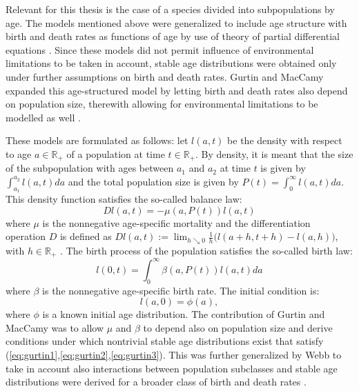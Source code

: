 \documentclass[11pt, a4paper]{article}
\theoremstyle{definition}
\begin{document}
    Relevant for this thesis is the case of a species divided into subpopulations by age. The models mentioned above were generalized to include age structure with birth and death rates as functions of age by use of theory of partial differential equations \autocite{lotka1911, mckendrick1925}. Since these models did not permit influence of environmental limitations to be taken in account, stable age distributions were obtained only under further assumptions on birth and death rates. Gurtin and MacCamy expanded this age-structured model by letting birth and death rates also depend on population size, therewith allowing for environmental limitations to be modelled as well \autocite{gurtin1974}.

    These models are formulated as follows: let $l(a,t)$ be the density with respect to age $a\in\mathbb{R}_+$ of a population at time $t\in\mathbb{R}_+$. By density, it is meant that the size of the subpopulation with ages between $a_1$ and $a_2$ at time $t$ is given by $\int_{a_1}^{a_2} l(a,t)da$ and the total population size is given by $P(t) = \int_0^{\infty} l(a,t)da$. This density function satisfies the so-called balance law:
    \begin{equation}\label{eq:gurtin1}
        Dl(a,t) = -\mu(a, P(t))l(a,t)
    \end{equation}
    where $\mu$ is the nonnegative age-specific mortality and the differentiation operation $D$ is defined as $Dl(a,t) := \lim_{h\searrow 0} \frac{1}{h}\big( l(a+h, t+h)-l(a,h)\big)$, with $h\in\mathbb{R}_+$ . The birth process of the population satisfies the so-called birth law:
    \begin{equation}\label{eq:gurtin2}
        l(0,t) = \int_0^{\infty} \beta(a, P(t))l(a,t) da
    \end{equation}
    where $\beta$ is the nonnegative age-specific birth rate. The initial condition is:
    \begin{equation} \label{eq:gurtin3}
        l(a,0) = \phi(a),
    \end{equation}
    where $\phi$ is a known initial age distribution. The contribution of Gurtin and MacCamy was to allow $\mu$ and $\beta$ to depend also on population size and derive conditions under which nontrivial stable age distributions exist that satisfy (\ref{eq:gurtin1},\ref{eq:gurtin2},\ref{eq:gurtin3}).
    This was further generalized by Webb to take in account also interactions between population subclasses and stable age distributions were derived for a broader class of birth and death rates \autocite{webb1985}.
\end{document}
